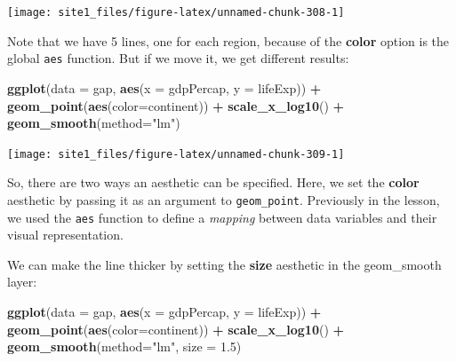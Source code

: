 \documentclass[]{book}
\newenvironment{Shaded}{\begin{snugshade}}{\end{snugshade}}
\newcommand{\KeywordTok}[1]{\textcolor[rgb]{0.13,0.29,0.53}{\textbf{#1}}}
\newcommand{\DataTypeTok}[1]{\textcolor[rgb]{0.13,0.29,0.53}{#1}}
\newcommand{\FloatTok}[1]{\textcolor[rgb]{0.00,0.00,0.81}{#1}}
\newcommand{\StringTok}[1]{\textcolor[rgb]{0.31,0.60,0.02}{#1}}
\newcommand{\OperatorTok}[1]{\textcolor[rgb]{0.81,0.36,0.00}{\textbf{#1}}}
\newcommand{\NormalTok}[1]{#1}
\begin{document}
\begin{center}\texttt{[image: site1\_files/figure-latex/unnamed-chunk-308-1]} \end{center}

Note that we have 5 lines, one for each region, because of the
\textbf{color} option is the global \texttt{aes} function. But if we
move it, we get different results:

\begin{Shaded}
\begin{Highlighting}[]
\KeywordTok{ggplot}\NormalTok{(}\DataTypeTok{data =}\NormalTok{ gap, }\KeywordTok{aes}\NormalTok{(}\DataTypeTok{x =}\NormalTok{ gdpPercap, }\DataTypeTok{y =}\NormalTok{ lifeExp)) }\OperatorTok{+}\StringTok{ }
\StringTok{  }\KeywordTok{geom_point}\NormalTok{(}\KeywordTok{aes}\NormalTok{(}\DataTypeTok{color=}\NormalTok{continent)) }\OperatorTok{+}\StringTok{ }
\StringTok{  }\KeywordTok{scale_x_log10}\NormalTok{() }\OperatorTok{+}\StringTok{ }
\StringTok{  }\KeywordTok{geom_smooth}\NormalTok{(}\DataTypeTok{method=}\StringTok{"lm"}\NormalTok{)}
\end{Highlighting}
\end{Shaded}

\begin{center}\texttt{[image: site1\_files/figure-latex/unnamed-chunk-309-1]} \end{center}

So, there are two ways an aesthetic can be specified. Here, we set the
\textbf{color} aesthetic by passing it as an argument to
\texttt{geom\_point}. Previously in the lesson, we used the \texttt{aes}
function to define a \emph{mapping} between data variables and their
visual representation.

We can make the line thicker by setting the \textbf{size} aesthetic in
the geom\_smooth layer:

\begin{Shaded}
\begin{Highlighting}[]
\KeywordTok{ggplot}\NormalTok{(}\DataTypeTok{data =}\NormalTok{ gap, }\KeywordTok{aes}\NormalTok{(}\DataTypeTok{x =}\NormalTok{ gdpPercap, }\DataTypeTok{y =}\NormalTok{ lifeExp)) }\OperatorTok{+}\StringTok{ }
\StringTok{  }\KeywordTok{geom_point}\NormalTok{(}\KeywordTok{aes}\NormalTok{(}\DataTypeTok{color=}\NormalTok{continent)) }\OperatorTok{+}\StringTok{ }
\StringTok{  }\KeywordTok{scale_x_log10}\NormalTok{() }\OperatorTok{+}\StringTok{ }
\StringTok{  }\KeywordTok{geom_smooth}\NormalTok{(}\DataTypeTok{method=}\StringTok{"lm"}\NormalTok{, }\DataTypeTok{size =} \FloatTok{1.5}\NormalTok{)}
\end{Highlighting}
\end{Shaded}
\end{document}
